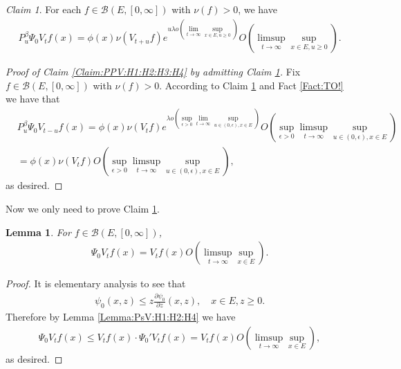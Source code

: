 \documentclass[12pt,a4paper]{amsart}
\numberwithin{equation}{section}
\theoremstyle{plain}
\newtheorem{lem}[thm]{Lemma}
\theoremstyle{definition}
\theoremstyle{remark}
\newtheorem{claim}[thm]{Claim}
\begin{document}
\begin{claim} \label{Claim:PuPVt:H1:H2:H3:H4}
For each $f\in \mathcal B(E,[0,\infty])$ with $\nu(f)>0$, we have
\begin{align}
 P_u^\beta \Psi_0 V_{t} f(x)
 = \phi(x) \nu(V_{t+u}f) e^{u\lambda o(\lim_{t\to \infty} \sup_{x\in E, u\geq 0})} O(\limsup_{t\to \infty}\sup_{x\in E, u\geq 0}).
 \end{align}
\end{claim}
\begin{proof}[{Proof of Claim \ref{Claim:PPV:H1:H2:H3:H4} by admitting Claim \ref{Claim:PuPVt:H1:H2:H3:H4}}]
Fix $f\in \mathcal B(E,[0,\infty])$ with $\nu(f)>0$.
According to Claim \ref{Claim:PuPVt:H1:H2:H3:H4} and Fact \ref{Fact:TO!} we have that
\begin{align}
 & P_u^\beta \Psi_0 V_{t-u} f(x)
 = \phi(x) \nu(V_{t}f) e^{\lambda o(\sup_{\epsilon > 0}\lim_{t\to \infty} \sup_{u\in (0,\epsilon), x\in E})} O(\sup_{\epsilon > 0} \limsup_{t\to \infty}\sup_{u\in (0,\epsilon), x\in E})
 \\&= \phi(x)\nu(V_tf) O(\sup_{\epsilon > 0} \limsup_{t\to \infty} \sup_{u \in (0,\epsilon), x\in E}),
 \end{align}
as desired.
\end{proof}
Now we only need to prove Claim \ref{Claim:PuPVt:H1:H2:H3:H4}.
\begin{lem} \label{Lemma:PVtV:H1:H2:H4}
For $f\in \mathcal B(E,[0,\infty])$,
\begin{align}
 \Psi_0 V_t f(x)
 = V_tf(x) O(\limsup_{t\to \infty}\sup_{x\in E}).
 \end{align}
\end{lem}
\begin{proof}
It is elementary analysis to see that
\begin{align}
 \psi_0(x,z)
 \leq z \frac{\partial \psi_0}{\partial z} (x,z),
 \quad x\in E, z\geq 0.
 \end{align}
Therefore by Lemma \ref{Lemma:PsV:H1:H2:H4} we have
\begin{align}
 \Psi_0 V_t f (x)
 \leq V_tf(x)\cdot \Psi_0' V_t f(x)
 = V_tf(x) O(\limsup_{t\to \infty}\sup_{x\in E} ),
 \end{align}
as desired.
\end{proof}
\end{document}
